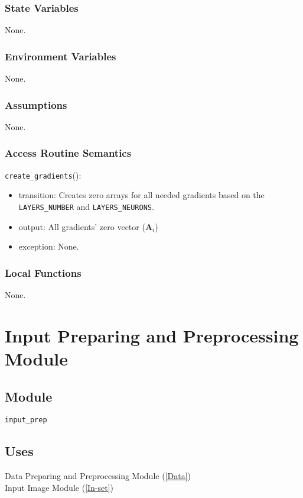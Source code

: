 \documentclass[12pt, titlepage]{article}
\def\code#1{\texttt{#1}}
\begin{document}
\subsubsection{State Variables}
None.

\subsubsection{Environment Variables}
None.

\subsubsection{Assumptions}
None.

\subsubsection{Access Routine Semantics}

\noindent \code{create\_gradients}():
\begin{itemize}
  \item transition: Creates zero arrays for all needed gradients based on the 
  \code{LAYERS\_NUMBER} and \code{LAYERS\_NEURONS}.
  \item output: All gradients' zero vector ($\mathbf{A}_{i}$)
  \item exception: None.
\end{itemize}

\subsubsection{Local Functions}
None.

\newpage

\section{Input Preparing and Preprocessing Module} \label{In-prep} 

\subsection{Module}
\code{input\_prep} 

\subsection{Uses}
Data Preparing and Preprocessing Module (\ref{Data})\\
Input Image Module (\ref{In-set}) 
\end{document}

